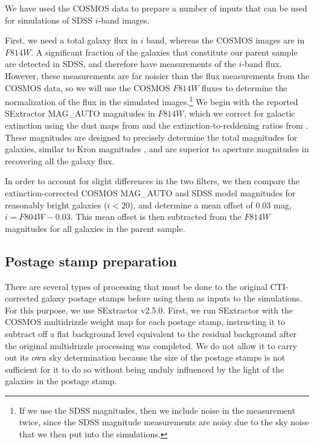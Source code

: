 \documentclass[twocolumn,useAMS,usenatbib]{mn2e}
\begin{document}
We have used the COSMOS data to prepare a number of inputs that can be
used for simulations of SDSS $i$-band images.

First, we need a total galaxy flux in $i$ band, whereas the COSMOS
images are in $F814W$.  A significant fraction of the galaxies that
constitute our parent sample are detected in SDSS, and therefore have
measurements of the $i$-band flux.  However, these measurements are
far noisier than the flux measurements from the COSMOS data, so we
will use the COSMOS $F814W$ fluxes to determine the normalization of the
flux in the simulated images.\footnote{If we use the SDSS magnitudes,
  then we include noise in the measurement twice, since the SDSS
  magnitude measurements are noisy due to the sky noise that we then
  put into the simulations.}  We begin with the reported SExtractor
MAG\_AUTO magnitudes in $F814W$, which we
correct for galactic extinction using the dust maps from
\cite{1998ApJ...500..525S} and the extinction-to-reddening ratios from
\cite{2002AJ....123..485S}.  These magnitudes are designed to
precisely determine the total magnitudes for galaxies, similar to Kron
magnitudes \citep{1980ApJS...43..305K}, and are superior to aperture
magnitudes in recovering all the galaxy flux.

In order to account for slight differences in the two filters, we then compare the extinction-corrected COSMOS
MAG\_AUTO and SDSS model magnitudes for reasonably bright galaxies
($i<20$), and determine a mean offset of $0.03$ mag, $i = F804W-0.03$.  This mean offset is then
subtracted from the $F814W$ magnitudes for all galaxies in the parent
sample.  %


\subsection{Postage stamp preparation}\label{SS:psprep}

There are several types of processing that must be done to the
original CTI-corrected galaxy
postage stamps before using them as inputs to the simulations.  For
this purpose, we use SExtractor \citep{1996A&AS..117..393B} {\sc
  v2.5.0}.  First, we run SExtractor with the COSMOS multidrizzle
weight map for each postage stamp, instructing it to subtract
off a flat background level equivalent to the residual background
after the original multidrizzle processing was completed.  We do not
allow it to carry out its own sky determination because the size of
the postage stamps is not sufficient for it to do so without being
unduly influenced by the light of the galaxies in the postage stamp.
\end{document}
